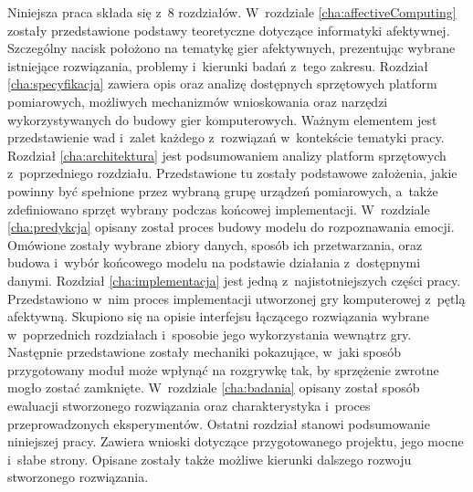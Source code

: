 Niniejsza praca składa się z~8 rozdziałów. W~rozdziale \ref{cha:affectiveComputing} zostały przedstawione podstawy teoretyczne dotyczące informatyki afektywnej. Szczególny nacisk położono na tematykę gier afektywnych, prezentując wybrane istniejące rozwiązania, problemy i~kierunki badań z~tego zakresu. Rozdział \ref{cha:specyfikacja} zawiera opis oraz analizę dostępnych sprzętowych platform pomiarowych, możliwych mechanizmów wnioskowania oraz narzędzi wykorzystywanych do budowy gier komputerowych. Ważnym elementem jest przedstawienie wad i~zalet każdego z~rozwiązań w~kontekście tematyki pracy. Rozdział \ref{cha:architektura} jest podsumowaniem analizy platform sprzętowych z~poprzedniego rozdziału. Przedstawione tu zostały podstawowe założenia, jakie powinny być spełnione przez wybraną grupę urządzeń pomiarowych, a~także zdefiniowano sprzęt wybrany podczas końcowej implementacji. W~rozdziale \ref{cha:predykcja} opisany został proces budowy modelu do rozpoznawania emocji. Omówione zostały wybrane zbiory danych, sposób ich przetwarzania, oraz budowa i~wybór końcowego modelu na podstawie działania z~dostępnymi danymi. Rozdział \ref{cha:implementacja} jest jedną z~najistotniejszych części pracy. Przedstawiono w~nim proces implementacji utworzonej gry komputerowej z~pętlą afektywną. Skupiono się na opisie interfejsu łączącego rozwiązania wybrane w~poprzednich rozdziałach i~sposobie jego wykorzystania wewnątrz gry. Następnie przedstawione zostały mechaniki pokazujące, w~jaki sposób przygotowany moduł może wpłynąć na rozgrywkę tak, by sprzężenie zwrotne mogło zostać zamknięte. W~rozdziale \ref{cha:badania} opisany został sposób ewaluacji stworzonego rozwiązania oraz charakterystyka i~proces przeprowadzonych eksperymentów. Ostatni rozdział stanowi podsumowanie niniejszej pracy. Zawiera wnioski dotyczące przygotowanego projektu, jego mocne i~słabe strony. Opisane zostały także możliwe kierunki dalszego rozwoju stworzonego rozwiązania. 
